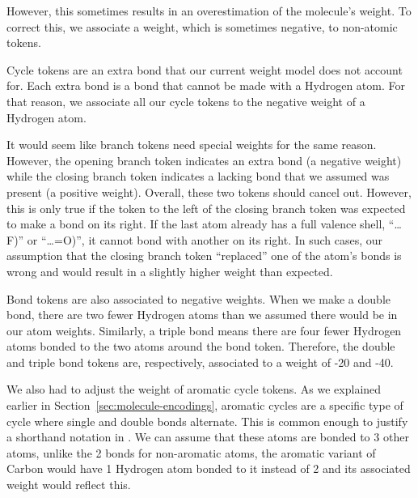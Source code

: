 \documentclass[../Document.tex]{subfiles}
\begin{document}
However, this sometimes results in an overestimation of the molecule's weight.
To correct this, we associate a weight, which is sometimes negative, to non-atomic tokens.

Cycle tokens are an extra bond that our current weight model does not account for.
Each extra bond is a bond that cannot be made with a Hydrogen atom.
For that reason, we associate all our cycle tokens to the negative weight of a Hydrogen atom.

It would seem like branch tokens need special weights for the same reason.
However, the opening branch token indicates an extra bond (\ie a negative weight) while the closing branch token indicates a lacking bond that we assumed was present (\ie a positive weight).
Overall, these two tokens should cancel out. However, this is only true if the token to the left of the closing branch token was expected to make a bond on its right. If the last atom already has a full valence shell, \eg ``\ldots F)'' or ``\ldots =O)'', it cannot bond with another on its right. In such cases, our assumption that the closing branch token ``replaced'' one of the atom's bonds is wrong and would result in a slightly higher weight than expected.

Bond tokens are also associated to negative weights.
When we make a double bond, there are two fewer Hydrogen atoms than we assumed there would be in our atom weights.
Similarly, a triple bond means there are four fewer Hydrogen atoms bonded to the two atoms around the bond token.
Therefore, the double and triple bond tokens are, respectively, associated to a weight of -20 and -40.

We also had to adjust the weight of aromatic cycle tokens.
As we explained earlier in Section~\ref{sec:molecule-encodings}, aromatic cycles are a specific type of cycle where single and double bonds alternate.
This is common enough to justify a shorthand notation in \smiles.
We can assume that these atoms are bonded to 3 other atoms, unlike the 2 bonds for non-aromatic atoms, \eg the aromatic variant of Carbon would have 1 Hydrogen atom bonded to it instead of 2 and its associated weight would reflect this.

\end{document}
